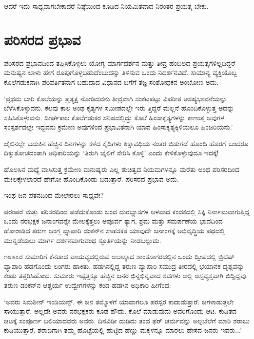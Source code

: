 ಆದರೆ ಇದು ಸಾಧ್ಯವಾಗಬೇಕಾದರೆ ನಿಷ್ಠೆಯಿಂದ ಕೂಡಿದ ನಿಯಮಿತವಾದ ನಿರಂತರ ಪ್ರಯತ್ನ ಬೇಕು.


\section*{ಪರಿಸರದ ಪ್ರಭಾವ}


ಪರಿಸರದ ಪ್ರಭಾವದಿಂದ ತಪ್ಪಿಸಿಕೊಳ್ಳಲು ಯೋಗ್ಯ ಮಾರ್ಗದರ್ಶನ ಮತ್ತು ತೀವ್ರ ಹಂಬಲದ ಪ್ರಯತ್ನಗಳಿಲ್ಲದಿದ್ದರೆ ಮನುಷ್ಯನ ಬಾಳು ಹೇಗೆ ರೂಪುಗೊಳ್ಳಬಹುದೆಂಬುದನ್ನು ತಿಳಿಸುವ ಒಂದು ನಿದರ್ಶನವಿದೆ. ಸಾಮಾನ್ಯ ವ್ಯಕ್ತಿಯೊಬ್ಬ ಕೊಲೆಗಡುಕನಾಗಿ ಪರಿವರ್ತಿತನಾಗ ಬಹುದಾದ ವಿಧಾನದ ಬಗೆಗೆ ತಜ್ಞ ಸಂಶೋಧಕನ ಅಂಬೋಣ ಅದು.

‘ಪ್ರಥಮ ಬಾರಿ ಕೊಲೆಯನ್ನು ಪ್ರತ್ಯಕ್ಷ ನೋಡಿದವನು ತೀವ್ರವಾಗಿ ಸಂಕಟಪಟ್ಟು ವಿಪರೀತ ಅಸಹ್ಯಭಾವನೆಯನ್ನು ಬೆಳೆಸಿಕೊಳ್ಳುವನು. ಕೆಲವು ಕಾಲ ಅಂಥ ಕೃತ್ಯಗಳ ಸಮೀಪದಲ್ಲೇ ಇರು ತ್ತಿದ್ದರೆ ಮೆಲ್ಲನೆ ಹೊಂದಿಕೊಳ್ಳುತ್ತ ಅದನ್ನು ಸಹಿಸಿಕೊಳ್ಳುವನು. ದೀರ್ಘಕಾಲ ಕೊಲೆಗಡುಕರ ಸನಿಹದಲ್ಲಿದ್ದು ಕೊಲೆ ಹಿಂಸಾಕೃತ್ಯಗಳನ್ನು ಕಾಣುತ್ತ ಅವುಗಳ ಸಂಸ್ಪರ್ಶದಲ್ಲೇ ಇದ್ದವನು ಕ್ರಮೇಣ ಅವುಗಳಿಂದ ಪ್ರಭಾವಿತನಾಗಿ ಯಾವ ಹಿಂಸಾಕೃತ್ಯಕ್ಕಿಳಿಯಲೂ ಹಿಂಜರಿಯನು.’

ಜೈಲಿನಲ್ಲೇ ಬದುಕಿನ ಹೆಚ್ಚಿನ ದಿನಗಳನ್ನು ಕಳೆದ ಕೈದಿಗಳು ಶಿಕ್ಷಾವಧಿಯ ನಂತರ ಬಿಡುಗಡೆ ಹೊಂದಿ ಹೊರಗೆ ಬಂದರೂ ದಿಕ್ಕುತೋಚದಂತಾಗಿ ಅಧಿಕಾರಿಯನ್ನು ‘ತಿರುಗಿ ಜೈಲಿಗೆ ಸೇರಿಸಿ ಕೊಳ್ಳಿ’ ಎಂದು ಕೇಳಿಕೊಳ್ಳುವುದೂ ಇದಕ್ಕೆ!

ಹೊಲಸಿನ ಮಧ್ಯೆ ವಾಸಿಸುತ್ತ ಕ್ರಮೇಣ ಮನುಷ್ಯರು ಎಲ್ಲ ಶುಚಿತ್ವದ ನಿಯಮಗಳನ್ನೂ ಮರೆತು ಅಂಥ ಪರಿಸರದಿಂದ ಮೇಲಕ್ಕೇಳಲಾರದೆ ಹೇಗೋ ಹೊಂದಿಕೊಂಡು ಬಿಡುತ್ತಾರೆ. ಪರಿಸರದ ಪ್ರಭಾವ ಅದು.

ಇಂಥ ಜನ ಪತನದಿಂದ ಮೇಲೇರಲು ಸಾಧ್ಯವೇ?

ಪರಂಪರೆ ಮತ್ತು ಪರಿಸರದಿಂದ ಪಡೆದುಕೊಂಡು ಬಂದ ದುರಭ್ಯಾಸಗಳ ಆಳವಾದ ಕಂದಕದಲ್ಲಿ ಸಿಕ್ಕಿ ನಿರ್ನಾಮವಾಗುತ್ತಿದ್ದ ಒಂದು ನರಭಕ್ಷಕ ಜನಾಂಗವನ್ನೇ ಮೇಲಕ್ಕೆತ್ತಲು ಅಪೂರ್ವ ತ್ಯಾಗ, ಶ್ರಮ ಮತ್ತು ಸಮರ್ಪಣೆಯ ಭಾವದಿಂದ ಹೋರಾಡಿದ ತರುಣ ಆಂಗ್ಲ ವ್ಯಾಪಾರಿ ಡಂಕನ್​ನ ಸಾಹಸಕತೆ ಯಾವುದೇ ಜನಾಂಗಕ್ಕೆ ಅಭಿವೃದ್ಧಿಯ ಪಥದಲ್ಲಿ ಮುನ್ನಡೆಯಲು ಮಾರ್ಗ ದರ್ಶನವಾಗುವಂಥ ಸ್ಫೂರ್ತಿಯನ್ನು ನೀಡಬಲ್ಲುದು.

೧೮೫೭ರ ಸುಮಾರಿಗೆ ಕೆನಡಾದ ವಾಯವ್ಯದಲ್ಲಿರುವ ಅಲಾಸ್ಕಾದ ಶಾಂತಸಾಗರದಲ್ಲಿನ ಒಂದು ದ್ವೀಪದಲ್ಲಿ ಬ್ರಿಟಿಷ್ ವ್ಯಾಪಾರಿ ಹಡಗೊಂದು ಲಂಗರು ಹಾಕಿತು. ಹಡಗಿನಲ್ಲಿದ್ದ ತರುಣ ವ್ಯಾಪಾರಿ ಸಮುದ್ರ ತೀರದಲ್ಲಿ ಭಯಾನಕ ದೃಶ್ಯವನ್ನು ಕಂಡು ತತ್ತರಿಸಿಹೋದ. ಸುಮಾರು ಇಪ್ಪತ್ತಕ್ಕೂ ಹೆಚ್ಚಿನ ಜನರ ಛಿನ್ನಭಿನ್ನವಾದ ಶವಗಳು ಅಲ್ಲಿ ಅಸ್ತವ್ಯಸ್ತವಾಗಿ ಬಿದ್ದಿದ್ದವು. ತರುಣ ಡಂಕನ್​ನ ಆಶ್ಚರ್ಯ ಉದ್ವೇಗಗಳನ್ನು ಕಂಡ ಹಡಗಿನ ಅಧಿಕಾರಿ ಹೀಗೆಂದ:

‘ಅವರು ಸಿಮಶೀನ್ ಇಂಡಿಯನ್ಸ್. ಈ ಜನ ತಮ್ಮೊಳಗೆ ಯಾವಾಗಲೂ ಪರಸ್ಪರ ಕಾದಾಡು\-ತ್ತಾರೆ. ಜಗಳಾಡುತ್ತಲೇ ಸಾಯುತ್ತಾರೆ. ಅಲ್ಲದೇ ಅವರು ನರಭಕ್ಷಕರು ಕೂಡ ಹೌದು. ಕೊಲೆ ಮಾಡುವುದು ಅವರಿಗೊಂದು ಆಟ. ಕುಡಿತದ ಚಟಕ್ಕೆ ಸಂಪೂರ್ಣ ಬಲಿಯಾದವರು ಅವರು. ದಿನವಿಡೀ ದುಡಿದು ತಂದ ಫರ್ ಚರ್ಮವನ್ನು ಅಲ್ಪಬೆಲೆಗೆ ಮಾರಿ ಶರಾಬು ಕುಡಿಯುತ್ತಾರೆ. ಶರಾಬಿಗಾಗಿ ತಮ್ಮ ಹೊಟ್ಟೆಯಲ್ಲಿ ಹುಟ್ಟಿದ ಹೆಣ್ಣು ಮಕ್ಕಳನ್ನೂ ಮಾರಲು ಹೇಸದ ಜನರು ಇವರು...’

